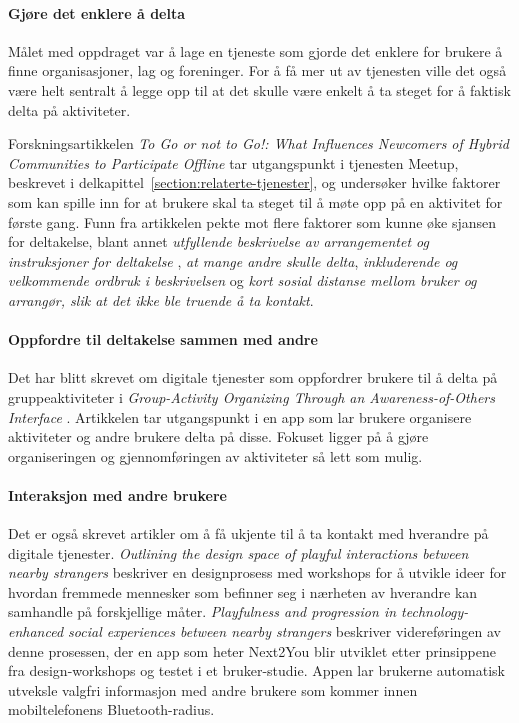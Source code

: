 \paragraph{Gjøre det enklere å delta}
Målet med oppdraget var å lage en tjeneste som gjorde det enklere for brukere å finne organisasjoner, lag og foreninger. For å få mer ut av tjenesten ville det også være helt sentralt å legge opp til at det skulle være enkelt å ta steget for å faktisk delta på aktiviteter. 

Forskningsartikkelen {\em To Go or not to Go!: What Influences Newcomers of Hybrid Communities to Participate Offline} \cite{NEWCOMERS:4:CT17} tar utgangspunkt i tjenesten Meetup, beskrevet i delkapittel~\ref{section:relaterte-tjenester}, og undersøker hvilke faktorer som kan spille inn for at brukere skal ta steget til å møte opp på en aktivitet for første gang. Funn fra artikkelen pekte mot flere faktorer som kunne øke sjansen for deltakelse, blant annet {\em utfyllende beskrivelse av arrangementet og instruksjoner for deltakelse
}, {\em at mange andre skulle delta}, {\em inkluderende og velkommende ordbruk i beskrivelsen} og {\em kort sosial distanse mellom bruker og arrangør, slik at det ikke ble truende å ta kontakt}. 

\paragraph{Oppfordre til deltakelse sammen med andre}
Det har blitt skrevet om digitale tjenester som oppfordrer brukere til å delta på gruppeaktiviteter i {\em Group-Activity Organizing Through an Awareness-of-Others Interface} \cite{AWARENESS:3:CSCW18}. Artikkelen tar utgangspunkt i en app som lar brukere organisere aktiviteter og andre brukere delta på disse. Fokuset ligger på å gjøre organiseringen og gjennomføringen av aktiviteter så lett som mulig.

\paragraph{Interaksjon med andre brukere}
Det er også skrevet artikler om å få ukjente til å ta kontakt med hverandre på digitale tjenester. {\em Outlining the design space of playful interactions between nearby strangers} \cite{NEARBY:5:AM16} beskriver en designprosess med workshops for å utvikle ideer for hvordan fremmede mennesker som befinner seg i nærheten av hverandre kan samhandle på forskjellige måter. {\em Playfulness and progression in technology-enhanced social experiences between nearby strangers} \cite{PLAYFUL:6:NORDICHI18} beskriver videreføringen av denne prosessen, der en app som heter Next2You blir utviklet etter prinsippene fra design-workshops og testet i et bruker-studie. Appen lar brukerne automatisk utveksle valgfri informasjon med andre brukere som kommer innen mobiltelefonens Bluetooth-radius.

